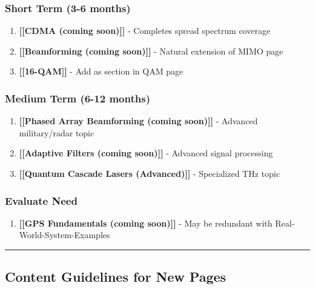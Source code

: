 \subsubsection{Short Term (3-6 months)}\label{short-term-3-6-months}

\begin{enumerate}
\def\labelenumi{\arabic{enumi}.}
\setcounter{enumi}{3}
\tightlist
\item
  \textbf{{[}{[}CDMA (coming soon){]}{]}} - Completes spread spectrum
  coverage
\item
  \textbf{{[}{[}Beamforming (coming soon){]}{]}} - Natural extension of
  MIMO page
\item
  \textbf{{[}{[}16-QAM{]}{]}} - Add as section in QAM page
\end{enumerate}

\subsubsection{Medium Term (6-12 months)}\label{medium-term-6-12-months}

\begin{enumerate}
\def\labelenumi{\arabic{enumi}.}
\setcounter{enumi}{6}
\tightlist
\item
  \textbf{{[}{[}Phased Array Beamforming (coming soon){]}{]}} - Advanced
  military/radar topic
\item
  \textbf{{[}{[}Adaptive Filters (coming soon){]}{]}} - Advanced signal
  processing
\item
  \textbf{{[}{[}Quantum Cascade Lasers (Advanced){]}{]}} - Specialized
  THz topic
\end{enumerate}

\subsubsection{Evaluate Need}\label{evaluate-need}

\begin{enumerate}
\def\labelenumi{\arabic{enumi}.}
\setcounter{enumi}{9}
\tightlist
\item
  \textbf{{[}{[}GPS Fundamentals (coming soon){]}{]}} - May be redundant
  with Real-World-System-Examples
\end{enumerate}

\begin{center}\rule{0.5\linewidth}{0.5pt}\end{center}

\subsection{\texorpdfstring{ Content Guidelines for New
Pages}{ Content Guidelines for New Pages}}\label{content-guidelines-for-new-pages}

